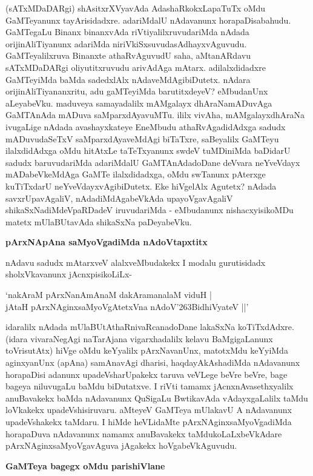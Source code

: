 (sATxMDaDARgi) shAsitxrXVyavAda AdashaRkokxLapaTuTx oMdu GaMTeyanunx tayArisidadxre. adariMdalU nAdavanunx horapaDisabahudu. GaMTegaLu Binanx binanxvAda riVtiyalilxruvudariMda nAdada orijinAliTiyanunx adariMda niriVkiSxsuvudasAdhayxvAguvudu. GaMTeyalilxruva Binanxte athaRvAguvudU saha, aMtanARdavu sATxMDaDARgi oliyutitxruvudu arivAdAga mAtarx. adilalxdidadxre GaMTeyiMda baMda sadedxlAlx nAdaveMdAgibiDutetx. nAdara orijinAliTiyananxritu, adu gaMTeyiMda barutitxdeyeV? eMbudanUnx aLeyabeVku. maduveya samayadalilx mAMgalayx dhAraNamADuvAga GaMTAnAda mADuva saMparxdAyavuMTu. ililx vivAha, mAMgalayxdhAraNa ivugaLige nAdada avashayxkateye EneMbudu athaRvAgadidAdxga sadudx mADuvudaSeTxV saMparxdAyaveMdAgi biTaTxre, saBeyalilx GaMTeyu ilalxdidAdxga oMdu hitAtxLe taTeTxyanunx swdeV tuMDiniMda baDidarU sadudx baruvudariMda adariMdalU GaMTAnAdadoDane deVvara neYveVdayx mADabeVkeMdAga GaMTe ilalxdidadxga, oMdu swTanunx pAterxge kuTiTxdarU neYveVdayxvAgibiDutetx. Eke hiVgelAlx Agutetx? nAdada savxrUpavAgaliV, nAdadiMdAgabeVkAda upayoVgavAgaliV shikaSxNadiMdeVpaRDadeV iruvudariMda - eMbudanunx nishacxyisikoMDu matetx mUlaBUtavAda shikaSxNa paDeyabeVku.

\noindent
{\bf\large{pArxNApAna saMyoVgadiMda nAdoVtapxtitx}}\label{page170}

nAdavu sadudx mAtarxveV alalxveMbudakekx I modalu gurutisidadx sholxVkavanunx jAcnxpisikoLiLx-

\begin{shloka}
`nakAraM pArxNanAmAnaM dakAramanalaM viduH |\\\label{170}
jAtaH pArxNAginxsaMyoVgAtetxVna nAdoV\char'263BidhiVyateV ||'
\end{shloka}

idaralilx nAdada mUlaBUtAthaRnivaRcanadoDane lakaSxNa koTiTxdAdxre. (idara vivaraNegAgi naTarAjana vigarxhadalilx kelavu BaMgigaLanunx toVrisutAtx) hiVge oMdu keYyalilx pArxNavanUnx, matotxMdu keYyiMda aginxyanUnx (apAna) samAnavAgi dharisi, haqdayAkAshadiMda nAdavanunx horapaDisi adanunx upadeVsharUpakekx taruva veVLege beVre beVre, bage bageya niluvugaLu baMdu biDutatxve. I riVti tamamx jAcnxnAvasethxyalilx anuBavakekx baMda nAdavanunx QuSigaLu BwtikavAda vAdayxgaLalilx taMdu loVkakekx upadeVshisiruvaru. aMteyeV GaMTeya mUlakavU A nAdavanunx upadeVshakekx taMdaru. I hiMde heVLidaMte pArxNAginxsaMyoVgadiMda horapaDuva nAdavanunx namamx anuBavakekx taMdukoLaLxbeVkAdare pArxNAginxsaMyoVgavAguva jAgakekx hoVgabeVkAguvudu.

\noindent
{\bf\large{GaMTeya bagegx oMdu parishiVlane}}\label{page170}

